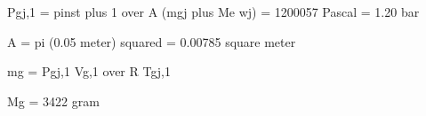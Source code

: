 Pgj,1 = pinst plus 1 over A (mgj plus Me wj) = 1200057 Pascal = 1.20 bar

A = pi (0.05 meter) squared = 0.00785 square meter

mg = Pgj,1 Vg,1 over R Tgj,1

Mg = 3422 gram